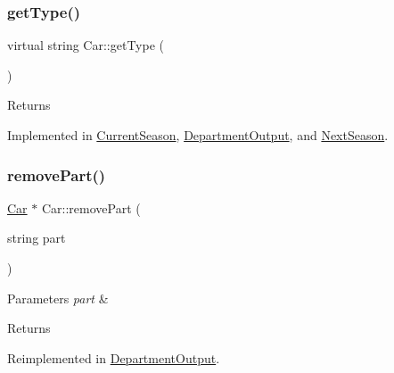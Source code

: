\subsubsection{\texorpdfstring{get\+Type()}{getType()}}
{\footnotesize\ttfamily virtual string Car\+::get\+Type (\begin{DoxyParamCaption}{ }\end{DoxyParamCaption})\hspace{0.3cm}{\ttfamily [pure virtual]}}

\begin{DoxyReturn}{Returns}

\end{DoxyReturn}


Implemented in \hyperlink{classCurrentSeason_abeb85d64969c9fd4945bf64ab0464ccd}{Current\+Season}, \hyperlink{classDepartmentOutput_a9366794b5b64ed37cf37ed6443eecf01}{Department\+Output}, and \hyperlink{classNextSeason_abe6df1f0b67eddbf990e9a92f6f68ff4}{Next\+Season}.

\mbox{\label{classCar_a54018ac7e84e79c8bfc1a8fba5e45b16}} 
\subsubsection{\texorpdfstring{remove\+Part()}{removePart()}}
{\footnotesize\ttfamily \hyperlink{classCar}{Car} $\ast$ Car\+::remove\+Part (\begin{DoxyParamCaption}\item[{string}]{part }\end{DoxyParamCaption})\hspace{0.3cm}{\ttfamily [virtual]}}


\begin{DoxyParams}{Parameters}
{\em part} & \\
\hline
\end{DoxyParams}
\begin{DoxyReturn}{Returns}

\end{DoxyReturn}


Reimplemented in \hyperlink{classDepartmentOutput_a8bd91d321113668938ecb8fb549d972c}{Department\+Output}.

\mbox{\label{classCar_ad7148bd1abe107ce2e2b134f78582c9d}} 
